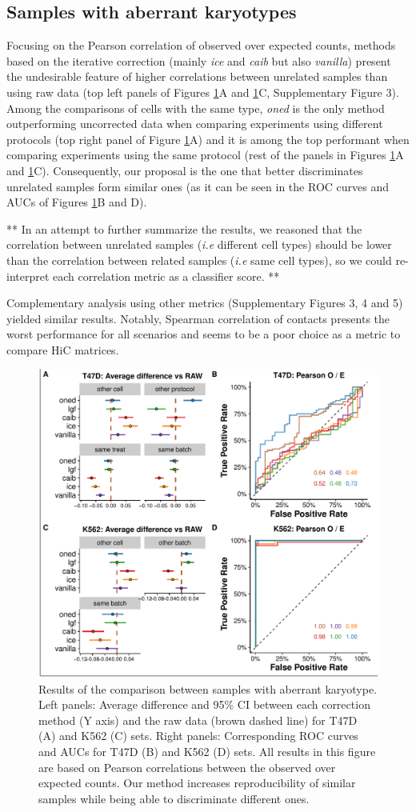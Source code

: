 \documentclass{bioinfo}
\begin{document}
\subsection{Samples with aberrant karyotypes}

Focusing on the Pearson correlation of observed over expected counts,
methods based on the iterative correction (mainly \textit{ice} and
\textit{caib} but also \textit{vanilla}) present the undesirable feature
of higher correlations between unrelated samples than using raw data (top
left panels of Figures \ref{fig:aberrant}A and \ref{fig:aberrant}C,
Supplementary Figure 3). Among the comparisons of cells with the same
type, \textit{oned} is the only method outperforming uncorrected data when
comparing experiments using different protocols (top right panel of Figure
\ref{fig:aberrant}A) and it is among the top performant when comparing
experiments using the same protocol (rest of the panels in Figures
\ref{fig:aberrant}A and \ref{fig:aberrant}C). Consequently, our proposal
is the one that better discriminates unrelated samples form similar ones
(as it can be seen in the ROC curves and AUCs of Figures
\ref{fig:aberrant}B and D).

**
In an attempt to further summarize the results, we reasoned that the
correlation between unrelated samples (\textit{i.e} different cell types)
should be lower than the correlation between related samples (\textit{i.e}
same cell types), so we could re-interpret each correlation metric as a
classifier score.
**

Complementary analysis using other metrics (Supplementary Figures 3, 4 and
5) yielded similar results. Notably, Spearman correlation of contacts
presents the worst performance for all scenarios and seems to be a poor
choice as a metric to compare HiC matrices.


\begin{figure}
	\centerline{\includegraphics[width=.50\textwidth]{img/correlation_aberrant_figure3.pdf}}
	\caption{
    Results of the comparison between samples with aberrant karyotype.
Left panels: Average difference and 95\% CI between each correction method
(Y axis) and the raw data (brown dashed line) for T47D (A) and K562 (C)
sets. Right panels: Corresponding ROC curves and AUCs for T47D (B) and
K562 (D) sets. All results in this figure are based on Pearson
correlations between the observed over expected counts. Our method
increases reproducibility of similar samples while being able to
discriminate different ones.  }\label{fig:aberrant}
\end{figure}
\end{document}
